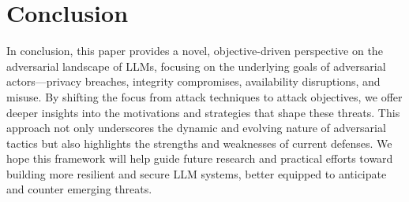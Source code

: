 \section{Conclusion} \label{sec:conclusion}

In conclusion, this paper provides a novel, objective-driven perspective on the adversarial landscape of LLMs, focusing on the underlying goals of adversarial actors—privacy breaches, integrity compromises, availability disruptions, and misuse. By shifting the focus from attack techniques to attack objectives, we offer deeper insights into the motivations and strategies that shape these threats. This approach not only underscores the dynamic and evolving nature of adversarial tactics but also highlights the strengths and weaknesses of current defenses. We hope this framework will help guide future research and practical efforts toward building more resilient and secure LLM systems, better equipped to anticipate and counter emerging threats.